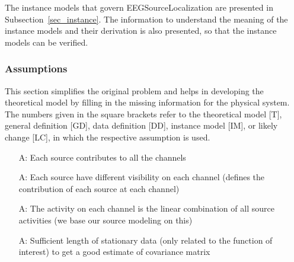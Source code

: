 \documentclass[12pt]{article}
\newcounter{assumpnum} %
\renewcommand{\progname}{EEGSourceLocalization}
\begin{document}
The instance models that govern \progname{} are presented in
Subsection~\ref{sec_instance}.  The information to understand the meaning of the
instance models and their derivation is also presented, so that the instance
models can be verified.

\subsubsection{Assumptions} \label{sec_assumpt}


This section simplifies the original problem and helps in developing the
theoretical model by filling in the missing information for the physical
system. The numbers given in the square brackets refer to the theoretical model
[T], general definition [GD], data definition [DD], instance model [IM], or
likely change [LC], in which the respective assumption is used.

\begin{itemize}

\item[A\refstepcounter{assumpnum}\theassumpnum \label{A_meaningfulLabel}:]
Each source contributes to all the channels 
\item[A\refstepcounter{assumpnum}\theassumpnum \label{A_meaningfulLabel}:] Each source have different visibility on each channel (defines the contribution of each source at each channel) 
\item[A\refstepcounter{assumpnum}\theassumpnum \label{A_meaningfulLabel}:] The activity on each channel is the linear combination of all source activities (we base our source modeling on this) 
\item[A\refstepcounter{assumpnum}\theassumpnum \label{A_meaningfulLabel}:]Sufficient length of stationary data (only related to the function of interest) to get a good estimate of covariance matrix 


\end{itemize}
\end{document}
